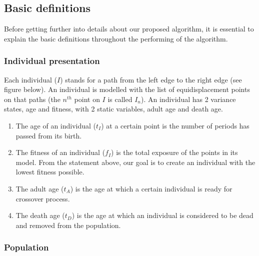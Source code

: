 \documentclass[review]{elsarticle}
\begin{document}
\subsection{Basic definitions}

Before getting further into details about our proposed algorithm, it is essential to explain the basic definitions throughout the performing of the algorithm.

\subsubsection{Individual presentation}

Each individual ($I$) stands for a path from the left edge to the right edge (see figure below). An individual is modelled with the list of equidisplacement points on that paths (the $n^{th}$ point on $I$ is called $I_n$). An individual has 2 variance states, age and fitness, with 2 static variables, adult age and death age.
\begin{enumerate}
	\item The age of an individual ($t_I$) at a certain point is the number of periods has passed from its birth.
	\item The fitness of an individual ($f_I$) is the total exposure of the points in its model. From the statement above, our goal is to create an individual with the lowest fitness possible.
	\item The adult age ($t_A$) is the age at which a certain individual is ready for crossover process.
	\item The death age ($t_D$) is the age at which an individual is considered to be dead and removed from the population.
\end{enumerate}

\subsubsection{Population}
\end{document}

